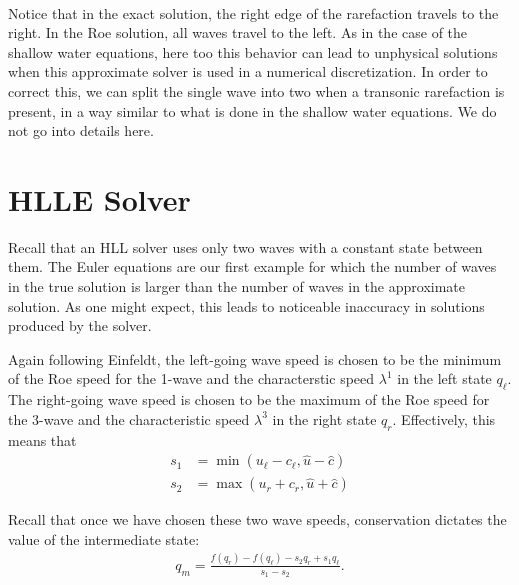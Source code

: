 \documentclass{SIAMbook2016}
\begin{document}
    \begin{center}
    \end{center}
    { \hspace*{\fill} \\}
    
Notice that in the exact solution, the right edge of the rarefaction
travels to the right. In the Roe solution, all waves travel to the left.
As in the case of the shallow water equations, here too this behavior
can lead to unphysical solutions when this approximate solver is used in
a numerical discretization. In order to correct this, we can split the
single wave into two when a transonic rarefaction is present, in a way
similar to what is done in the shallow water equations. We do not go
into details here.

\hypertarget{hlle-solver}{%
\section{HLLE Solver}\label{hlle-solver}}

Recall that an HLL solver uses only two waves with a constant state
between them. The Euler equations are our first example for which the
number of waves in the true solution is larger than the number of waves
in the approximate solution. As one might expect, this leads to
noticeable inaccuracy in solutions produced by the solver.

Again following Einfeldt, the left-going wave speed is chosen to be the
minimum of the Roe speed for the 1-wave and the characterstic speed
\(\lambda^1\) in the left state \(q_\ell\). The right-going wave speed
is chosen to be the maximum of the Roe speed for the 3-wave and the
characteristic speed \(\lambda^3\) in the right state \(q_r\).
Effectively, this means that \begin{align}
    s_1 & = \min(u_\ell - c_\ell, \hat{u}-\hat{c}) \\
    s_2 & = \max(u_r + c_r, \hat{u}+\hat{c})
\end{align}

Recall that once we have chosen these two wave speeds, conservation
dictates the value of the intermediate state:\\
\begin{align}  \label{EA:hll_middle_state}
q_m = \frac{f(q_r) - f(q_\ell) - s_2 q_r + s_1 q_\ell}{s_1 - s_2}.
\end{align}
\end{document}
